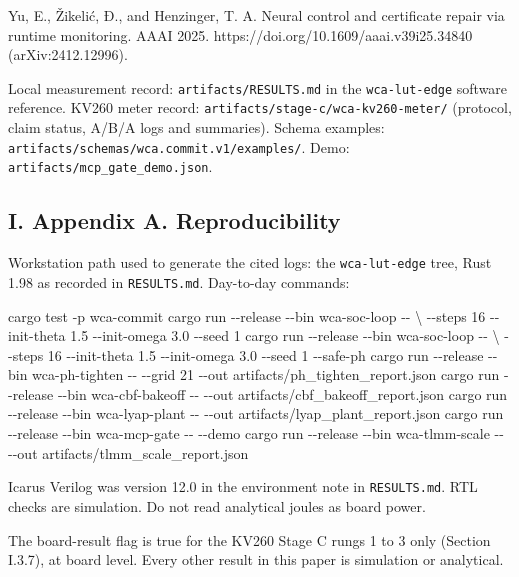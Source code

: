 \documentclass[
  10pt,
]{article}
\newenvironment{Shaded}{}{}
\newcommand{\NormalTok}[1]{#1}
\begin{document}
Yu, E., Žikelić, Đ., and Henzinger, T. A. Neural control and certificate
repair via runtime monitoring. AAAI 2025.
https://doi.org/10.1609/aaai.v39i25.34840 (arXiv:2412.12996).

Local measurement record: \texttt{artifacts/RESULTS.md} in the
\texttt{wca-lut-edge} software reference. KV260 meter record:
\texttt{artifacts/stage-c/wca-kv260-meter/} (protocol, claim status,
A/B/A logs and summaries). Schema examples:
\texttt{artifacts/schemas/wca.commit.v1/examples/}. Demo:
\texttt{artifacts/mcp\_gate\_demo.json}.

\subsection{I. Appendix A.
Reproducibility}\label{i.-appendix-a.-reproducibility}

Workstation path used to generate the cited logs: the
\texttt{wca-lut-edge} tree, Rust 1.98 as recorded in
\texttt{RESULTS.md}. Day-to-day commands:

\begin{Shaded}
\begin{Highlighting}[]
\NormalTok{cargo test {-}p wca{-}commit}
\NormalTok{cargo run {-}{-}release {-}{-}bin wca{-}soc{-}loop {-}{-} \textbackslash{}}
\NormalTok{  {-}{-}steps 16 {-}{-}init{-}theta 1.5 {-}{-}init{-}omega 3.0 {-}{-}seed 1}
\NormalTok{cargo run {-}{-}release {-}{-}bin wca{-}soc{-}loop {-}{-} \textbackslash{}}
\NormalTok{  {-}{-}steps 16 {-}{-}init{-}theta 1.5 {-}{-}init{-}omega 3.0 {-}{-}seed 1 {-}{-}safe{-}ph}
\NormalTok{cargo run {-}{-}release {-}{-}bin wca{-}ph{-}tighten {-}{-} {-}{-}grid 21 {-}{-}out artifacts/ph\_tighten\_report.json}
\NormalTok{cargo run {-}{-}release {-}{-}bin wca{-}cbf{-}bakeoff {-}{-} {-}{-}out artifacts/cbf\_bakeoff\_report.json}
\NormalTok{cargo run {-}{-}release {-}{-}bin wca{-}lyap{-}plant {-}{-} {-}{-}out artifacts/lyap\_plant\_report.json}
\NormalTok{cargo run {-}{-}release {-}{-}bin wca{-}mcp{-}gate {-}{-} {-}{-}demo}
\NormalTok{cargo run {-}{-}release {-}{-}bin wca{-}tlmm{-}scale {-}{-} {-}{-}out artifacts/tlmm\_scale\_report.json}
\end{Highlighting}
\end{Shaded}

Icarus Verilog was version 12.0 in the environment note in
\texttt{RESULTS.md}. RTL checks are simulation. Do not read analytical
joules as board power.

The board-result flag is true for the KV260 Stage C rungs 1 to 3 only
(Section I.3.7), at board level. Every other result in this paper is
simulation or analytical.
\end{document}
